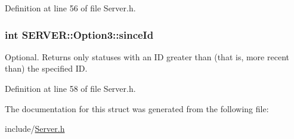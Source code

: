 Definition at line 56 of file Server.h.\hypertarget{structSERVER_1_1Option3_7acbe4cffada84ed124186614322c162}{
\subsubsection{\setlength{\rightskip}{0pt plus 5cm}int {\bf SERVER::Option3::sinceId}}}
\label{structSERVER_1_1Option3_7acbe4cffada84ed124186614322c162}


Optional. Returns only statuses with an ID greater than (that is, more recent than) the specified ID. 



Definition at line 58 of file Server.h.

The documentation for this struct was generated from the following file:\begin{CompactItemize}
\item 
include/\hyperlink{Server_8h}{Server.h}\end{CompactItemize}
